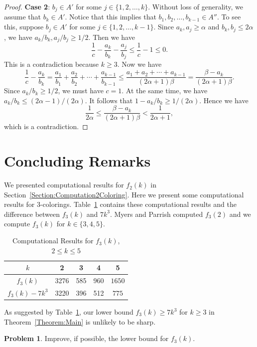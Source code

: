 \documentclass[11pt]{article}
\theoremstyle{definition}
\newtheorem{problem}[theorem]{Problem}
\begin{document}
\begin{proof}
{\bf Case 2}: $b_j\in A'$ for some $j\in\{1,2,\ldots,k\}$. Without loss of generality, we assume that $b_k\in A'$. Notice that this implies that $b_1,b_2,\ldots,b_{k-1}\in A''$. To see this, suppose $b_j\in A'$ for some $j\in\{1,2,\ldots,k-1\}$. Since $a_k,a_j\geq\alpha$ and $b_k,b_j\leq 2\alpha$, we have $a_k/b_k,a_j/b_j\geq1/2$. Then we have
    \[
    \frac{1}{c}-\frac{a_k}{b_k}-\frac{a_j}{b_j}\leq\frac{1}{c}-1\leq0.
    \]
    This is a contradiction because $k\geq3$. Now we have
    \[
    \frac{1}{c}-\frac{a_k}{b_k}=\frac{a_1}{b_1}+\frac{a_2}{b_2}+\cdots+\frac{a_{k-1}}{b_{k-1}}\leq\frac{a_1+a_2+\cdots+a_{k-1}}{(2\alpha+1)\beta}=\frac{\beta-a_k}{(2\alpha+1)\beta}.
    \]
    Since $a_k/b_k\geq1/2$, we must have $c=1$. At the same time, we have $a_k/b_k\leq (2\alpha-1)/(2\alpha)$. It follows that $1-a_k/b_k\geq1/(2\alpha)$. Hence we have
    \[
    \frac{1}{2\alpha}\leq\frac{\beta-a_k}{(2\alpha+1)\beta}<\frac{1}{2\alpha+1},
    \]
    which is a contradiction.
\end{proof}


\section{Concluding Remarks}\label{Section:Concluding}
We presented computational results for $f_2(k)$ in Section~\ref{Section:Computation2Coloring}. Here we present some computational results for 3-colorings. Table~\ref{Table3} contains these computational results and the difference between $f_3(k)$ and $7k^3$. Myers and Parrish \cite{MyersParrish2018} computed $f_3(2)$ and we compute $f_3(k)$ for $k\in\{3,4,5\}$. 
\begin{table}[H]
\renewcommand{\arraystretch}{1.5}
\centering
\begin{tabular}{|c|c|c|c|c|}
\hline
$k$&2&3&4&5\\\hline
$f_3(k)$&3276&585&960&$1650$\\\hline
$f_3(k)-7k^3$&3220&396&512&$775$\\\hline
\end{tabular}
\caption{Computational Results for $f_3(k)$, $2\leq k\leq 5$}\label{Table3}
\end{table}
As suggested by Table~\ref{Table3}, our lower bound $f_3(k)\geq7k^3$ for $k\geq3$ in Theorem~\ref{Theorem:Main} is unlikely to be sharp.

\begin{problem}
    Improve, if possible, the lower bound for $f_3(k)$.
\end{problem}
\end{document}
